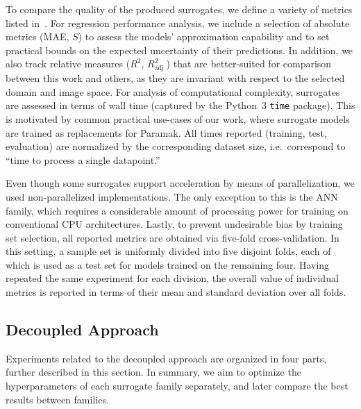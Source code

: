 To compare the quality of the produced surrogates, we define a variety of metrics listed
in~. For regression performance analysis, we include a
selection of absolute metrics (MAE, $S$) to assess the models' approximation capability
and to set practical bounds on the expected uncertainty of their predictions. In addition, we also track
relative measures ($R^2$, $R^2_\text{adj.}$) that are better-suited for comparison between this work and others, as
they are invariant with respect to the selected domain and image space.
For analysis of computational complexity, surrogates are assessed in terms of wall
time (captured by the Python~3 \texttt{time} package). This is motivated by common practical use-cases of our work, where surrogate models are trained as replacements for
Paramak. All times reported (training, test, evaluation) are
normalized by the corresponding dataset size, i.e.~correspond to ``time to
process a single datapoint.''

Even though some surrogates support acceleration by means of parallelization, we
used non-parallelized implementations. The only exception to this is the ANN family,
which requires a considerable amount of processing power for training on
conventional CPU architectures. Lastly, to prevent undesirable bias by training
set selection, all reported metrics are obtained via five-fold cross-validation.
In this setting, a sample set is uniformly divided into five disjoint folds, each of which
is used as a test set for models trained on the remaining four. Having repeated the
same experiment for each division, the overall value of individual metrics is reported in terms of their mean and standard deviation over all folds.



\subsection{Decoupled Approach}\label{sec:experiment-methodology}

Experiments related to the decoupled approach are organized in four parts,
further described in this section. In summary, we aim to optimize the hyperparameters of
each surrogate family separately, and later compare the best results between
families.

